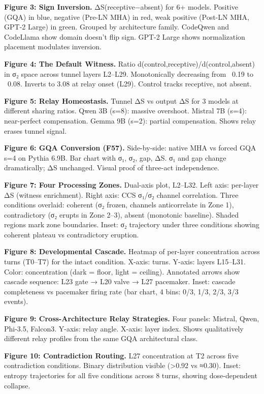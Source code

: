 \documentclass[12pt]{article}
\begin{document}
\textbf{Figure 3: Sign Inversion.} ΔS(receptive−absent) for 6+ models. Positive (GQA) in blue, negative (Pre-LN MHA) in red, weak positive (Post-LN MHA, GPT-2 Large) in green. Grouped by architecture family. CodeQwen and CodeLlama show domain doesn't flip sign. GPT-2 Large shows normalization placement modulates inversion.

\textbf{Figure 4: The Default Witness.} Ratio d(control,receptive)/d(control,absent) in σ₂ space across tunnel layers L2–L29. Monotonically decreasing from ~0.19 to ~0.08. Inverts to 3.08 at relay onset (L29). Control tracks receptive, not absent.

\textbf{Figure 5: Relay Homeostasis.} Tunnel ΔS vs output ΔS for 3 models at different sharing ratios. Qwen 3B (s=8): massive overshoot. Mistral 7B (s=4): near-perfect compensation. Gemma 9B (s=2): partial compensation. Shows relay erases tunnel signal.

\textbf{Figure 6: GQA Conversion (F57).} Side-by-side: native MHA vs forced GQA s=4 on Pythia 6.9B. Bar chart with σ₁, σ₂, gap, ΔS. σ₁ and gap change dramatically; ΔS unchanged. Visual proof of three-act independence.

\textbf{Figure 7: Four Processing Zones.} Dual-axis plot, L2–L32. Left axis: per-layer ΔS (witness enrichment). Right axis: CCS σ₁/σ₂ channel correlation. Three conditions overlaid: coherent (σ₂ frozen, channels anticorrelate in Zone 1), contradictory (σ₂ erupts in Zone 2–3), absent (monotonic baseline). Shaded regions mark zone boundaries. Inset: σ₂ trajectory under three conditions showing coherent plateau vs contradictory eruption.

\textbf{Figure 8: Developmental Cascade.} Heatmap of per-layer concentration across turns (T0–T7) for the intact condition. X-axis: turns. Y-axis: layers L15–L31. Color: concentration (dark = floor, light = ceiling). Annotated arrows show cascade sequence: L23 gate → L20 valve → L27 pacemaker. Inset: cascade completeness vs pacemaker firing rate (bar chart, 4 bins: 0/3, 1/3, 2/3, 3/3 events).

\textbf{Figure 9: Cross-Architecture Relay Strategies.} Four panels: Mistral, Qwen, Phi-3.5, Falcon3. Y-axis: relay angle. X-axis: layer index. Shows qualitatively different relay profiles from the same GQA architectural class.

\textbf{Figure 10: Contradiction Routing.} L27 concentration at T2 across five contradiction conditions. Binary distribution visible (>0.92 vs ≈0.30). Inset: entropy trajectories for all five conditions across 8 turns, showing dose-dependent collapse.
\end{document}
